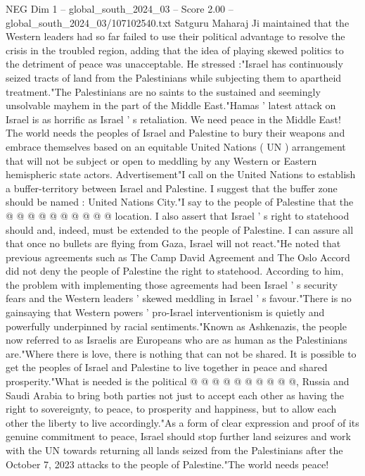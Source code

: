 \begin{textsample}{NEG Dim 1 – global\_south\_2024\_03 – Score 2.00 – global\_south\_2024\_03/107102540.txt}  \label{ex:f1_neg_437}
Satguru Maharaj Ji maintained that the Western leaders had so far failed to use their political advantage to resolve the crisis in the troubled region, adding that the idea of playing skewed politics to the detriment of peace was unacceptable.
He stressed :"Israel has continuously seized tracts of land from the Palestinians while subjecting them to apartheid treatment."The Palestinians are no saints to the sustained and seemingly unsolvable mayhem in the part of the Middle East."Hamas ' latest attack on Israel is as horrific as Israel ' s retaliation.
We need peace in the Middle East!
The world needs the peoples of Israel and Palestine to bury their weapons and embrace themselves based on an equitable United Nations ( UN ) arrangement that will not be subject or open to meddling by any Western or Eastern hemispheric state actors.
Advertisement"I call on the United Nations to establish a buffer-territory between Israel and Palestine.
I suggest that the buffer zone should be named : United Nations City."I say to the people of Palestine that the @ @ @ @ @ @ @ @ @ @ location.
I also assert that Israel ' s right to statehood should and, indeed, must be extended to the people of Palestine.
I can assure all that once no bullets are flying from Gaza, Israel will not react."He noted that previous agreements such as The Camp David Agreement and The Oslo Accord did not deny the people of Palestine the right to statehood.
According to him, the problem with implementing those agreements had been Israel ' s security fears and the Western leaders ' skewed meddling in Israel ' s favour."There is no gainsaying that Western powers ' pro-Israel interventionism is quietly and powerfully underpinned by racial sentiments."Known as Ashkenazis, the people now referred to as Israelis are Europeans who are as human as the Palestinians are."Where there is love, there is nothing that can not be shared.
It is possible to get the peoples of Israel and Palestine to live together in peace and shared prosperity."What is needed is the political @ @ @ @ @ @ @ @ @ @, Russia and Saudi Arabia to bring both parties not just to accept each other as having the right to sovereignty, to peace, to prosperity and happiness, but to allow each other the liberty to live accordingly."As a form of clear expression and proof of its genuine commitment to peace, Israel should stop further land seizures and work with the UN towards returning all lands seized from the Palestinians after the October 7, 2023 attacks to the people of Palestine."The world needs peace!

\end{textsample}
